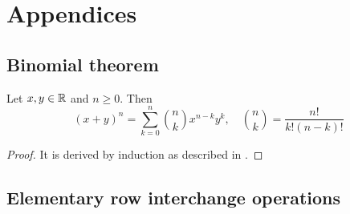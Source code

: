 \documentclass[a4paper]{article}
\begin{document}
\newpage
\printbibliography





\newpage
\appendix

\section{Appendices}
\newpage
\subsection{Binomial theorem}
\label{app:binomial}

\begin{theorem}
Let $x,y\in\mathbb{R}$ and $n\geq 0$. Then
\begin{equation*}
   (x+y)^n = \sum_{k=0}^n\binom{n}{k}x^{n-k}y^k, \quad \binom{n}{k} = \frac{n!}{k!(n-k)!}
\end{equation*}
\end{theorem}

\begin{proof}
It is derived by induction as described in \cite{amsi}.
\end{proof}

\newpage
\subsection{Elementary row interchange operations}
\label{app:elem_row}
\end{document}
